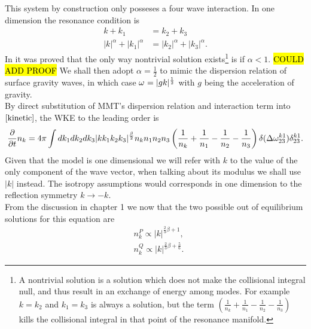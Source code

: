     This system by construction only posseses a four wave interaction. In one dimension the resonance condition is
    \begin{equation}
        \begin{aligned}
            k + k_1 &= k_2 + k_3 \\
            |k|^\alpha + |k_1|^\alpha &= |k_2|^\alpha + |k_3|^\alpha.
        \end{aligned}
    \end{equation}
    In \cite{Majda1997} it was proved that the only way nontrivial solution exists\footnote{
        A nontrivial solution is a solution which does not make the collisional integral null, and thus result in an exchange of energy among modes. 
        For example $k=k_2$ and $k_1=k_3$ is always a solution, but the term 
        $\left(\frac{1}{n_k} +\frac{1}{n_1} -\frac{1}{n_2}-\frac{1}{n_3} \right)$ kills the collisional integral in that point of the resonance manifold.
    } is if $\alpha < 1$. \hl{COULD ADD PROOF} We shall then adopt $\alpha = \frac{1}{2}$ to mimic the dispersion relation of surface gravity waves, in which case $\omega^{} = |gk|^\frac{1}{2}$ 
    with $g$ being the acceleration of gravity.\\
    By direct substitution of MMT's dispersion relation and interaction term into $\eqref{kinetic}$, the WKE to the leading order is 
    \begin{equation}
        \frac{\partial}{\partial t} n_k = 4 \pi\int dk_1 dk_2 dk_3 \\
        |kk_1k_2k_3|^\frac{\beta}{2}n_kn_1n_2n_3
    \left(\frac{1}{n_k} + \frac{1}{n_1} - \frac{1}{n_2}- \frac{1}{n_3}  \right)
    \delta(\Delta{\omega}^{k1}_{23})\delta^{k1}_{23}.
    \end{equation}
    Given that the model is one dimensional we will refer with $k$ to the value of the only component of the wave vector, when talking about its modulus we shall use $|k|$ instead. The isotropy assumptions would corresponds in one dimension
    to the reflection symmetry $k \rightarrow -k$.\\ 
    From the discussion in chapter 1 we now that the two possible out of equilibrium solutions for this equation are 
    \begin{equation}
        \begin{aligned}
        &n_k^P \propto |k|^{\frac{2}{3}\beta + 1}, \\
        &n_k^Q \propto |k|^{\frac{2}{3}\beta + \frac{5}{6}}.
        \end{aligned}
        \label{MMTKZ}
    \end{equation}
